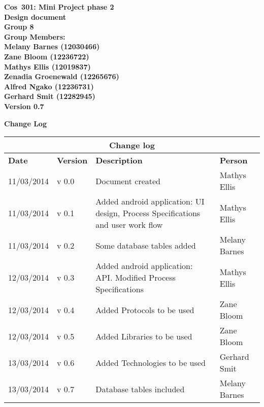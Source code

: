 \documentclass[12pt]{article}
\newcommand{\Title}{Design document} %
\newcommand{\Class}{Cos\ 301} %
\begin{document}
	\vspace{4em}
	
	\begin{center}%
	\LARGE \bf \Class: Mini Project phase 2 \\
	  \LARGE \bf \Title \\[4em]
	  \LARGE {\bf Group 8}\\[1em]
	  \LARGE {\bf Group Members:}\\[2em]
	  \large
	     Melany Barnes					(12030466) \\[1em]
	     Zane Bloom						(12236722) \\[1em]
	     Mathys Ellis					(12019837) \\[1em]
	     Zenadia Groenewald				(12265676) \\[1em]
	     Alfred Ngako					(12236731) \\[1em]
	  	 Gerhard Smit					(12282945) \\[1em]
	     {\bf Version 0.7}
	    
	\end{center}
	
	\newpage
		{\LARGE \bf Change Log}\\[2em]
		
		\begin{center}
		\begin{tabular}{|l|p{1.4cm}|p{8cm}|p{2.8cm}|}
		\hline
		\multicolumn{4}{|c|}{\bf Change log} \\
		\hline
		\bf Date & \bf Version & \bf Description & \bf Person \\
		\hline
		11/03/2014 & v 0.0 & Document created & Mathys Ellis \\
		\hline
		11/03/2014 & v 0.1 & Added android application: UI design, Process Specifications and user work flow & Mathys Ellis \\
		\hline
		11/03/2014 & v 0.2 & Some database tables added & Melany Barnes \\
		\hline
		12/03/2014 & v 0.3 & Added android application: API. Modified Process Specifications & Mathys Ellis \\
		\hline
		12/03/2014 & v 0.4 & Added Protocols to be used & Zane Bloom \\
		\hline
		12/03/2014 & v 0.5 & Added Libraries to be used & Zane Bloom \\
		\hline
		13/03/2014 & v 0.6 & Added Technologies to be used & Gerhard Smit \\
		\hline
		13/03/2014 & v 0.7 & Database tables included & Melany Barnes \\
		\hline
		
		\end{tabular}
		\end{center}
		
\end{document}
